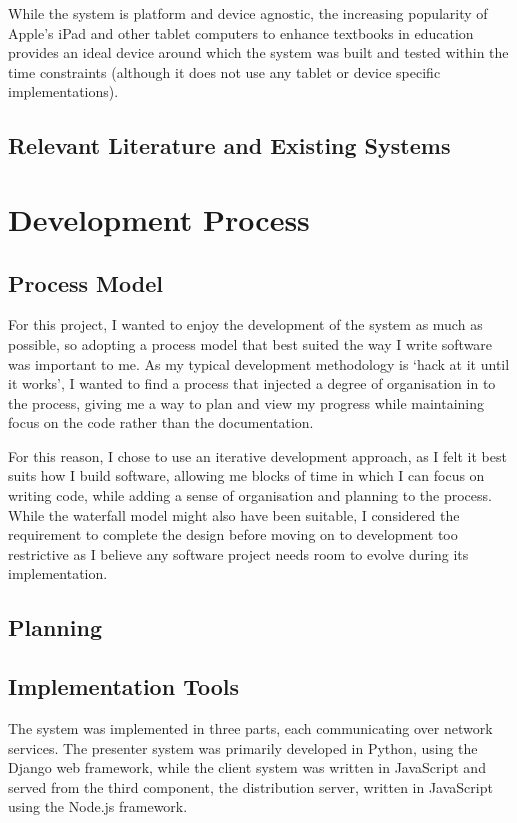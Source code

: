 \documentclass[a4papert,11pt,notitlepage]{ltxdoc}
\begin{document}
While the system is platform and device agnostic, the increasing popularity of Apple's iPad and other tablet computers to enhance textbooks in education provides an ideal device around which the system was built and tested within the time constraints (although it does not use any tablet or device specific implementations).

\subsection{Relevant Literature and Existing Systems}
\pagebreak

\section{Development Process}
\subsection{Process Model}
For this project, I wanted to enjoy the development of the system as much as possible, so adopting a process model that best suited the way I write software was important to me. As my typical development methodology is `hack at it until it works', I wanted to find a process that injected a degree of organisation in to the process, giving me a way to plan and view my progress while maintaining focus on the code rather than the documentation.

For this reason, I chose to use an iterative development approach, as I felt it best suits how I build software, allowing me blocks of time in which I can focus on writing code, while adding a sense of organisation and planning to the process. While the waterfall model might also have been suitable, I considered the requirement to complete the design before moving on to development too restrictive as I believe any software project needs room to evolve during its implementation.

\subsection{Planning}

\subsection{Implementation Tools}
The system was implemented in three parts, each communicating over network services. The presenter system was primarily developed in Python\cite{python:web}, using the Django\cite{django:web} web framework, while the client system was written in JavaScript and served from the third component, the distribution server, written in JavaScript using the Node.js\cite{nodejs:web} framework.
\end{document}

